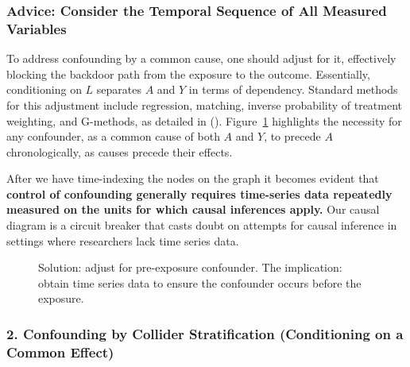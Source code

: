 \documentclass[
  singlecolumn,
  9pt]{article}
\begin{document}
\subsubsection{Advice: Consider the Temporal Sequence of All Measured
Variables}\label{advice-consider-the-temporal-sequence-of-all-measured-variables}

To address confounding by a common cause, one should adjust for it,
effectively blocking the backdoor path from the exposure to the outcome.
Essentially, conditioning on \(L\) separates \(A\) and \(Y\) in terms of
dependency. Standard methods for this adjustment include regression,
matching, inverse probability of treatment weighting, and G-methods, as
detailed in ().
Figure~\ref{fig-dag-common-cause-solution} highlights the necessity for
any confounder, as a common cause of both \(A\) and \(Y\), to precede
\(A\) chronologically, as causes precede their effects.

After we have time-indexing the nodes on the graph it becomes evident
that \textbf{control of confounding generally requires time-series data
repeatedly measured on the units for which causal inferences apply.} Our
causal diagram is a circuit breaker that casts doubt on attempts for
causal inference in settings where researchers lack time series data.

\begin{figure}


\caption{\label{fig-dag-common-cause-solution}Solution: adjust for
pre-exposure confounder. The implication: obtain time series data to
ensure the confounder occurs before the exposure.}

\end{figure}%

\subsubsection{2. Confounding by Collider Stratification (Conditioning
on a Common
Effect)}\label{confounding-by-collider-stratification-conditioning-on-a-common-effect}
\end{document}
